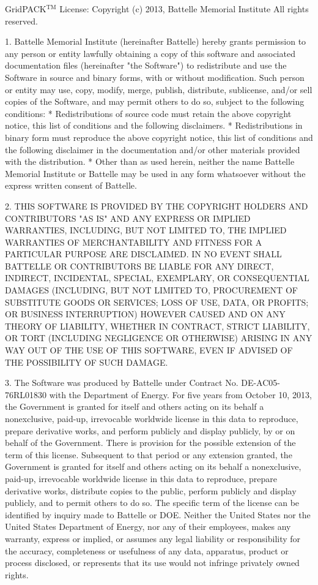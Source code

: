 GridPACK$\mathrm{{}^{TM}}$ License: Copyright (c) 2013, Battelle Memorial Institute All rights reserved.

1. Battelle Memorial Institute (hereinafter Battelle) hereby grants permission to any person or entity lawfully obtaining a copy of this software and associated documentation files (hereinafter "the Software") to redistribute and use the Software in source and binary forms, with or without modification.  Such person or entity may use, copy, modify, merge, publish, distribute, sublicense, and/or sell copies of the Software, and may permit others to do so, subject to the following conditions:
* Redistributions of source code must retain the above copyright notice, this list of conditions and the following disclaimers. 
* Redistributions in binary form must reproduce the above copyright notice, this list of conditions and the following disclaimer in the documentation and/or other materials provided with the distribution. 
* Other than as used herein, neither the name Battelle Memorial Institute or Battelle may be used in any form whatsoever without the express written consent of Battelle.   

2.      THIS SOFTWARE IS PROVIDED BY THE COPYRIGHT HOLDERS AND CONTRIBUTORS "AS IS" AND ANY EXPRESS OR IMPLIED WARRANTIES, INCLUDING, BUT NOT LIMITED TO, THE IMPLIED WARRANTIES OF MERCHANTABILITY AND FITNESS FOR A PARTICULAR PURPOSE ARE DISCLAIMED. IN NO EVENT SHALL BATTELLE OR CONTRIBUTORS BE LIABLE FOR ANY DIRECT, INDIRECT, INCIDENTAL, SPECIAL, EXEMPLARY, OR CONSEQUENTIAL DAMAGES (INCLUDING, BUT NOT LIMITED TO, PROCUREMENT OF SUBSTITUTE GOODS OR SERVICES; LOSS OF USE, DATA, OR PROFITS; OR BUSINESS INTERRUPTION) HOWEVER CAUSED AND ON ANY THEORY OF LIABILITY, WHETHER IN CONTRACT, STRICT LIABILITY, OR TORT (INCLUDING NEGLIGENCE OR OTHERWISE) ARISING IN ANY WAY OUT OF THE USE OF THIS SOFTWARE, EVEN IF ADVISED OF THE POSSIBILITY OF SUCH DAMAGE.

3.      The Software was produced by Battelle under Contract No. DE-AC05-76RL01830 with the Department of Energy.  For five  years from October 10, 2013, the Government is granted for itself and others acting on its behalf a nonexclusive, paid-up, irrevocable worldwide license in this data to reproduce, prepare derivative works, and perform publicly and display publicly, by or on behalf of the Government.  There is provision for the possible extension of the term of this license.  Subsequent to that period or any extension granted, the Government is granted for itself and others acting on its behalf a nonexclusive, paid-up, irrevocable worldwide license in this data to reproduce, prepare derivative works, distribute copies to the public, perform publicly and display publicly, and to permit others to do  so.  The specific term of the license can be identified by inquiry made to Battelle or DOE.  Neither the United States nor the United States Department of Energy, nor any of their employees, makes any warranty, express or implied, or assumes any legal liability or responsibility for the accuracy, completeness or usefulness of any data, apparatus, product or process disclosed, or represents that its use would not infringe privately owned rights.
